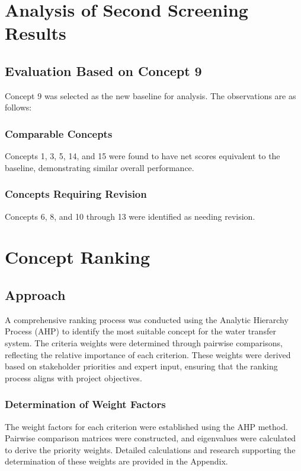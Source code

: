 \documentclass[12pt]{report}
\begin{document}
\section{Analysis of Second Screening Results}

\subsection{Evaluation Based on Concept 9}  

Concept 9 was selected as the new baseline for analysis. The observations are as follows: 

\subsubsection{Comparable Concepts}  
Concepts 1, 3, 5, 14, and 15 were found to have net scores equivalent to the baseline, demonstrating similar overall performance.  

\subsubsection{Concepts Requiring Revision}  
Concepts 6, 8, and 10 through 13 were identified as needing revision.

\section{Concept Ranking}

\subsection{Approach}

A comprehensive ranking process was conducted using the Analytic Hierarchy Process (AHP) to identify the most suitable concept for the water transfer system. The criteria weights were determined through pairwise comparisons, reflecting the relative importance of each criterion. These weights were derived based on stakeholder priorities and expert input, ensuring that the ranking process aligns with project objectives.

\subsubsection{Determination of Weight Factors}

The weight factors for each criterion were established using the AHP method. Pairwise comparison matrices were constructed, and eigenvalues were calculated to derive the priority weights. Detailed calculations and research supporting the determination of these weights are provided in the Appendix.
\end{document}
